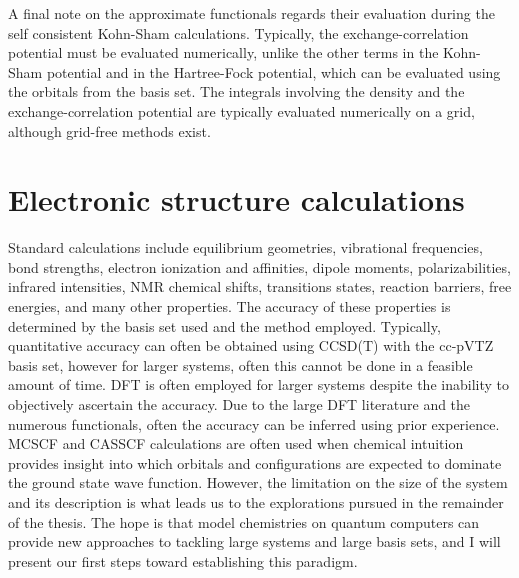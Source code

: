 \documentclass[11pt,oneside,final]{huthesis}%
\begin{document}
A final note on the approximate functionals regards their evaluation during the self consistent Kohn-Sham calculations.  Typically, the exchange-correlation potential must be evaluated numerically, unlike the other terms in the Kohn-Sham potential and in the Hartree-Fock potential, which can be evaluated using the orbitals from the basis set.   The integrals involving the density and the exchange-correlation  potential are typically evaluated numerically on a grid, although grid-free methods exist.  


\section{Electronic structure calculations}

Standard calculations include equilibrium geometries, vibrational frequencies, bond strengths, electron ionization and affinities, dipole moments, polarizabilities, infrared intensities, NMR chemical shifts, transitions states, reaction barriers, free energies, and many other properties.  The accuracy of these properties is determined by the basis set used and the method employed. 
Typically, quantitative accuracy can often be obtained using CCSD(T) with the cc-pVTZ basis set, however for larger systems, often this cannot be done in a feasible amount of time.  DFT is often employed for larger systems despite the inability to objectively ascertain the accuracy.  Due to the large DFT literature and the numerous functionals, often the accuracy can be inferred using prior experience.  MCSCF and CASSCF calculations are often used when chemical intuition provides insight into which orbitals and configurations are expected to dominate the ground state wave function.  However, the limitation on the size of the system and its description is what leads us to the explorations pursued in the remainder of the thesis.  The hope is that model chemistries on quantum computers can provide new approaches to tackling large systems and large basis sets, and I will present our first steps toward establishing this paradigm.   

\end{document}
